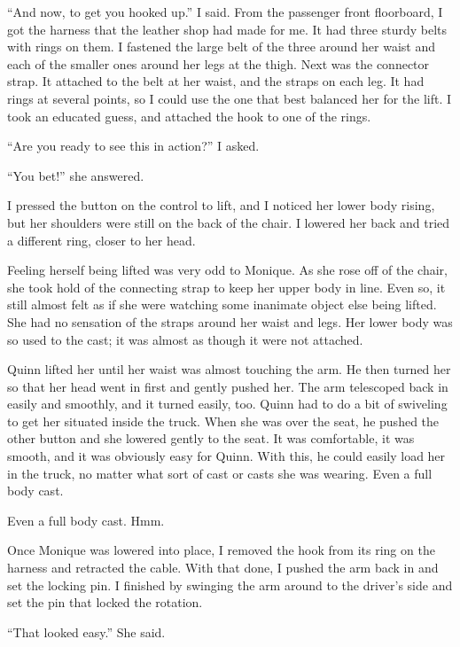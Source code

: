 ``And now, to get you hooked up.'' I said. From the passenger front floorboard, I got the
harness that the leather shop had made for me. It had three sturdy belts with rings on them. I
fastened the large belt of the three around her waist and each of the smaller ones around her
legs at the thigh. Next was the connector strap. It attached to the belt at her waist, and the
straps on each leg. It had rings at several points, so I could use the one that best balanced
her for the lift. I took an educated guess, and attached the hook to one of the rings.

``Are you ready to see this in action?'' I asked.

``You bet!'' she answered.

I pressed the button on the control to lift, and I noticed her lower body rising, but her
shoulders were still on the back of the chair. I lowered her back and tried a different ring,
closer to her head.

\begin{thought}
Feeling herself being lifted was very odd to Monique. As she rose off of the chair, she
took hold of the connecting strap to keep her upper body in line. Even so, it still almost felt
as if she were watching some inanimate object else being lifted. She had no sensation of the
straps around her waist and legs. Her lower body was so used to the cast; it was almost as
though it were not attached.

Quinn lifted her until her waist was almost touching the arm. He then turned her so that
her head went in first and gently pushed her. The arm telescoped back in easily and smoothly,
and it turned easily, too. Quinn had to do a bit of swiveling to get her situated inside the
truck. When she was over the seat, he pushed the other button and she lowered gently to the
seat. It was comfortable, it was smooth, and it was obviously easy for Quinn. With this, he
could easily load her in the truck, no matter what sort of cast or casts she was wearing. Even a
full body cast.

Even a full body cast. Hmm.
\end{thought}

Once Monique was lowered into place, I removed the hook from its ring on the harness and
retracted the cable. With that done, I pushed the arm back in and set the locking pin. I
finished by swinging the arm around to the driver's side and set the pin that locked the
rotation.

``That looked easy.'' She said.

